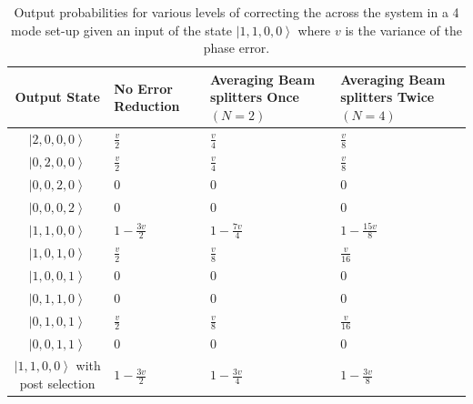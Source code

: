 \documentclass[aps,pra,twocolumn,superscriptaddress,numerical]{revtex4-1}
\begin{document}
\begin{widetext}
\begin{table}
{		\begin{centering}
			\begin{tabular}{|c|>{\centering}p{4cm}|>{\centering}p{4cm}|>{\centering}p{4cm}|}
				\hline 
				Output State & No Error Reduction & Averaging Beam splitters Once $\left(N=2\right)$ & Averaging Beam splitters Twice $\left(N=4\right)$\tabularnewline
				\hline 
				\hline 
				$\left|2,0,0,0\right\rangle $ & $\frac{v}{2}$ & $\frac{v}{4}$ & $\frac{v}{8}$\tabularnewline
				\hline 
				$\left|0,2,0,0\right\rangle $ & $\frac{v}{2}$ & $\frac{v}{4}$ & $\frac{v}{8}$\tabularnewline
				\hline 
				$\left|0,0,2,0\right\rangle $ & $0$ & $0$ & $0$\tabularnewline
				\hline 
				$\left|0,0,0,2\right\rangle $ & $0$ & $0$ & $0$\tabularnewline
				\hline 
				$\left|1,1,0,0\right\rangle $ & $1-\frac{3v}{2}$ & $1-\frac{7v}{4}$ & $1-\frac{15v}{8}$\tabularnewline
				\hline 
				$\left|1,0,1,0\right\rangle $ & $\frac{v}{2}$ & $\frac{v}{8}$ & $\frac{v}{16}$\tabularnewline
				\hline 
				$\left|1,0,0,1\right\rangle $ & $0$ & $0$ & $0$\tabularnewline
				\hline 
				$\left|0,1,1,0\right\rangle $ & $0$ & $0$ & $0$\tabularnewline
				\hline 
				$\left|0,1,0,1\right\rangle $ & $\frac{v}{2}$ & $\frac{v}{8}$ & $\frac{v}{16}$\tabularnewline
				\hline 
				$\left|0,0,1,1\right\rangle $ & $0$ & $0$ & $0$\tabularnewline
				\hline 
				$\left|1,1,0,0\right\rangle $ with post selection & $1-\frac{3v}{2}$ & $1-\frac{3v}{4}$ & $1-\frac{3v}{8}$\tabularnewline
				\hline 
			\end{tabular}
			\par\end{centering}
		
	}
	
	\caption[Output probabilities for various levels of correcting the across the
	system in a 4 mode set-up given an input of the state $\left|1,1,0,0\right\rangle $.]{Output probabilities for various levels of correcting the across
		the system in a 4 mode set-up given an input of the state $\left|1,1,0,0\right\rangle $
		where $v$ is the variance of the phase error. \label{tab:1,1 photon output prob as}}
\end{table}
\end{widetext}
\end{document}

